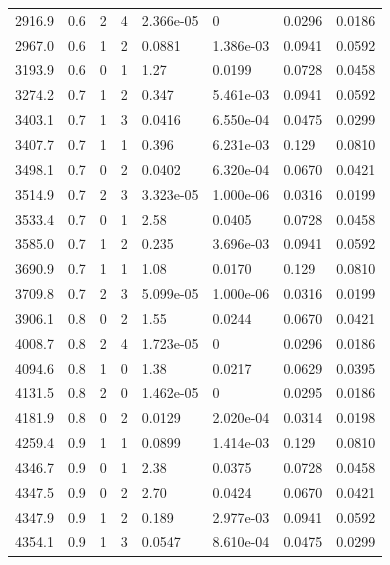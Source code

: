 \documentclass[preview]{standalone}
\begin{document}
{{{\begin{tabular}{L{1.2cm}C{1.2cm} C{0.3cm}C{0.5cm} C{1.4cm}C{1.4cm} C{1.4cm}C{1.4cm}}
  2916.9  &   0.6  & 2     &  4 &  2.366e-05  & 0  & 0.0296 &  0.0186   \\ 
  2967.0  &   0.6  & 1     &  2 &  0.0881  & 1.386e-03  & 0.0941 &  0.0592   \\ 
  3193.9  &   0.6  & 0     &  1 &  1.27  & 0.0199  & 0.0728 &  0.0458   \\ 
  3274.2  &   0.7  & 1     &  2 &  0.347  & 5.461e-03  & 0.0941 &  0.0592   \\ 
  3403.1  &   0.7  & 1     &  3 &  0.0416  & 6.550e-04  & 0.0475 &  0.0299   \\ 
  3407.7  &   0.7  & 1     &  1 &  0.396  & 6.231e-03  & 0.129 &  0.0810   \\ 
  3498.1  &   0.7  & 0     &  2 &  0.0402  & 6.320e-04  & 0.0670 &  0.0421   \\ 
  3514.9  &   0.7  & 2     &  3 &  3.323e-05  & 1.000e-06  & 0.0316 &  0.0199   \\ 
  3533.4  &   0.7  & 0     &  1 &  2.58  & 0.0405  & 0.0728 &  0.0458   \\ 
  3585.0  &   0.7  & 1     &  2 &  0.235  & 3.696e-03  & 0.0941 &  0.0592   \\ 
  3690.9  &   0.7  & 1     &  1 &  1.08  & 0.0170  & 0.129 &  0.0810   \\ 
  3709.8  &   0.7  & 2     &  3 &  5.099e-05  & 1.000e-06  & 0.0316 &  0.0199   \\ 
  3906.1  &   0.8  & 0     &  2 &  1.55  & 0.0244  & 0.0670 &  0.0421   \\ 
  4008.7  &   0.8  & 2     &  4 &  1.723e-05  & 0  & 0.0296 &  0.0186   \\ 
  4094.6  &   0.8  & 1     &  0 &  1.38  & 0.0217  & 0.0629 &  0.0395   \\ 
  4131.5  &   0.8  & 2     &  0 &  1.462e-05  & 0  & 0.0295 &  0.0186   \\ 
  4181.9  &   0.8  & 0     &  2 &  0.0129  & 2.020e-04  & 0.0314 &  0.0198   \\ 
  4259.4  &   0.9  & 1     &  1 &  0.0899  & 1.414e-03  & 0.129 &  0.0810   \\ 
  4346.7  &   0.9  & 0     &  1 &  2.38  & 0.0375  & 0.0728 &  0.0458   \\ 
  4347.5  &   0.9  & 0     &  2 &  2.70  & 0.0424  & 0.0670 &  0.0421   \\ 
  4347.9  &   0.9  & 1     &  2 &  0.189  & 2.977e-03  & 0.0941 &  0.0592   \\ 
  4354.1  &   0.9  & 1     &  3 &  0.0547  & 8.610e-04  & 0.0475 &  0.0299   \\ 

\end{tabular}}}}
\end{document}
